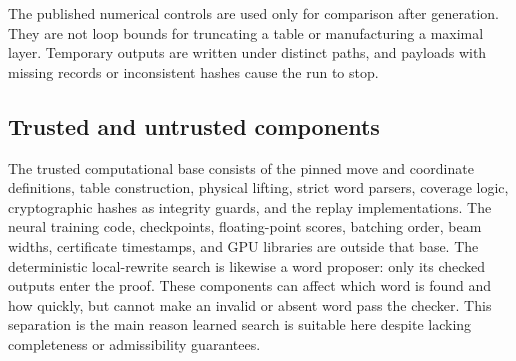 The published numerical controls are used only for comparison after
generation.  They are not loop bounds for truncating a table or manufacturing
a maximal layer.  Temporary outputs are written under distinct paths, and
payloads with missing records or inconsistent hashes cause the run to stop.

\subsection{Trusted and untrusted components}

The trusted computational base consists of the pinned move and coordinate
definitions, table construction, physical lifting, strict word parsers,
coverage logic, cryptographic hashes as integrity guards, and the replay
implementations.  The neural training code, checkpoints, floating-point
scores, batching order, beam widths, certificate timestamps, and GPU libraries
are outside that base.  The deterministic local-rewrite search is likewise a
word proposer: only its checked outputs enter the proof.  These components can
affect which word is found and how quickly, but cannot make an invalid or
absent word pass the checker.  This separation is the main reason learned
search is suitable here despite lacking completeness or admissibility
guarantees.
